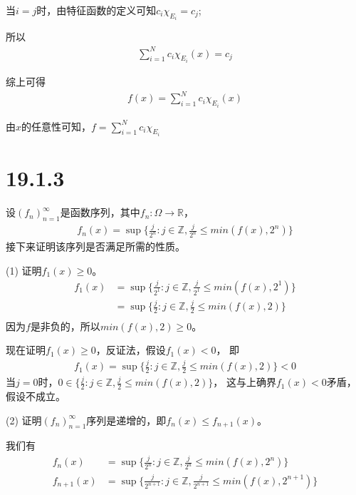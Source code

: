\documentclass{article}
\begin{document}
当$i = j$时，由特征函数的定义可知$c_i \chi_{E_i} = c_j$;

所以
\begin{align*}
  \sum \limits_{i = 1}^N c_i \chi_{E_i}(x) = c_j
\end{align*}

综上可得
\begin{align*}
  f(x) = \sum \limits_{i = 1}^N c_i \chi_{E_i}(x)
\end{align*}

由$x$的任意性可知，$f =  \sum \limits_{i = 1}^N c_i \chi_{E_i}$

\section*{19.1.3}

设$(f_n)_{n = 1}^\infty$是函数序列，其中$f_n:  \Omega \to \mathbb{R}$，
\begin{align*}
  f_n(x) = \sup\{\frac{j}{2^n}: j \in \mathbb{Z}, \frac{j}{2^n} \leq min(f(x), 2^n)\}
\end{align*}
接下来证明该序列是否满足所需的性质。

(1) 证明$f_1(x) \geq 0$。
\begin{align*}
  f_1(x) & = \sup\{\frac{j}{2^1}: j \in \mathbb{Z}, \frac{j}{2^1} \leq min(f(x), 2^1)\} \\
         & = \sup\{\frac{j}{2}: j \in \mathbb{Z}, \frac{j}{2} \leq min(f(x), 2)\}       \\
\end{align*}
因为$f$是非负的，所以$min(f(x), 2) \geq 0$。

现在证明$f_1(x) \geq 0$，反证法，假设$f_1(x) < 0$，
即
\begin{align*}
  f_1(x) = \sup\{\frac{j}{2}: j \in \mathbb{Z}, \frac{j}{2} \leq min(f(x), 2)\} < 0
\end{align*}
当$j = 0$时，$0 \in \{\frac{j}{2}: j \in \mathbb{Z}, \frac{j}{2} \leq min(f(x), 2)\}$，
这与上确界$f_1(x) < 0$矛盾，假设不成立。

(2) 证明$(f_n)_{n = 1}^\infty$序列是递增的，即$f_n(x) \leq f_{n + 1}(x)$。

我们有
\begin{align*}
  f_n(x)       & = \sup\{\frac{j}{2^n}: j \in \mathbb{Z}, \frac{j}{2^n} \leq min(f(x), 2^n)\}                   \\
  f_{n + 1}(x) & = \sup\{\frac{j}{2^{n + 1}}: j \in \mathbb{Z}, \frac{j}{2^{n + 1}} \leq min(f(x), 2^{n + 1})\}
\end{align*}
\end{document}
